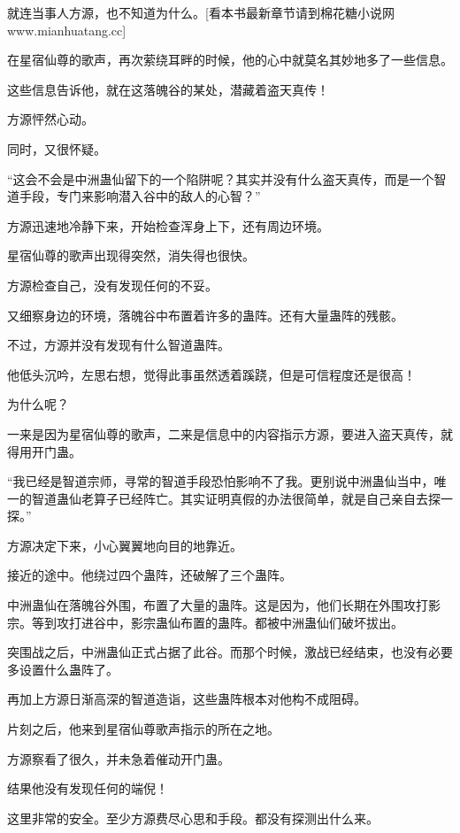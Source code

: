 
\begin{this_body}

就连当事人方源，也不知道为什么。[看本书最新章节请到棉花糖小说网www.mianhuatang.cc]

在星宿仙尊的歌声，再次萦绕耳畔的时候，他的心中就莫名其妙地多了一些信息。

这些信息告诉他，就在这落魄谷的某处，潜藏着盗天真传！

方源怦然心动。

同时，又很怀疑。

“这会不会是中洲蛊仙留下的一个陷阱呢？其实并没有什么盗天真传，而是一个智道手段，专门来影响潜入谷中的敌人的心智？”

方源迅速地冷静下来，开始检查浑身上下，还有周边环境。

星宿仙尊的歌声出现得突然，消失得也很快。

方源检查自己，没有发现任何的不妥。

又细察身边的环境，落魄谷中布置着许多的蛊阵。还有大量蛊阵的残骸。

不过，方源并没有发现有什么智道蛊阵。

他低头沉吟，左思右想，觉得此事虽然透着蹊跷，但是可信程度还是很高！

为什么呢？

一来是因为星宿仙尊的歌声，二来是信息中的内容指示方源，要进入盗天真传，就得用开门蛊。

“我已经是智道宗师，寻常的智道手段恐怕影响不了我。更别说中洲蛊仙当中，唯一的智道蛊仙老算子已经阵亡。其实证明真假的办法很简单，就是自己亲自去探一探。”

方源决定下来，小心翼翼地向目的地靠近。

接近的途中。他绕过四个蛊阵，还破解了三个蛊阵。

中洲蛊仙在落魄谷外围，布置了大量的蛊阵。这是因为，他们长期在外围攻打影宗。等到攻打进谷中，影宗蛊仙布置的蛊阵。都被中洲蛊仙们破坏拔出。

突围战之后，中洲蛊仙正式占据了此谷。而那个时候，激战已经结束，也没有必要多设置什么蛊阵了。

再加上方源日渐高深的智道造诣，这些蛊阵根本对他构不成阻碍。

片刻之后，他来到星宿仙尊歌声指示的所在之地。

方源察看了很久，并未急着催动开门蛊。

结果他没有发现任何的端倪！

这里非常的安全。至少方源费尽心思和手段。都没有探测出什么来。


\end{this_body}
